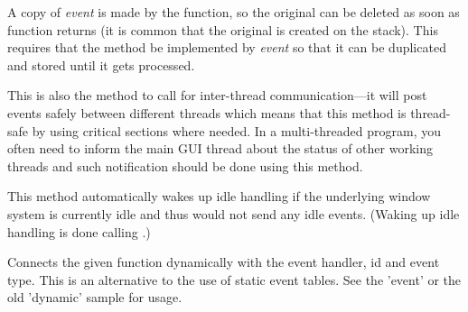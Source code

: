 A copy of {\it event} is made by the function, so the original can be deleted
as soon as function returns (it is common that the original is created on the
stack).  This requires that the  method
be implemented by {\it event} so that it can be duplicated and stored until
it gets processed.

This is also the method to call for inter-thread communication---it will
post events safely between different threads which means that this method is
thread-safe by using critical sections where needed.  In a multi-threaded
program, you often need to inform the main GUI thread about the status of
other working threads and such notification should be done using this method.

This method automatically wakes up idle handling if the underlying window 
system is currently idle and thus would not send any idle events. (Waking
up idle handling is done calling .)

\label{wxevthandlerconnect}




Connects the given function dynamically with the event handler, id and event type. This
is an alternative to the use of static event tables. See the 'event' or the old 'dynamic' sample for usage.





